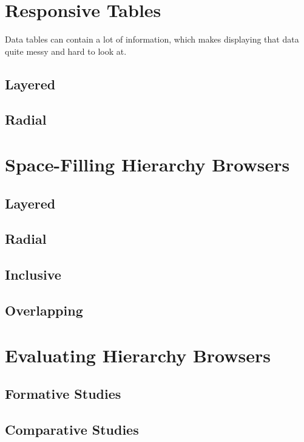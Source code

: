 \section{Responsive Tables}

Data tables can contain a lot of information, which makes displaying that data quite messy and hard to
look at.
\subsection{Layered}

\subsection{Radial}





\section{Space-Filling Hierarchy Browsers}

\subsection{Layered}

\subsection{Radial}

\subsection{Inclusive}

\subsection{Overlapping}






\section{Evaluating Hierarchy Browsers}

\subsection{Formative Studies}

\subsection{Comparative Studies}



